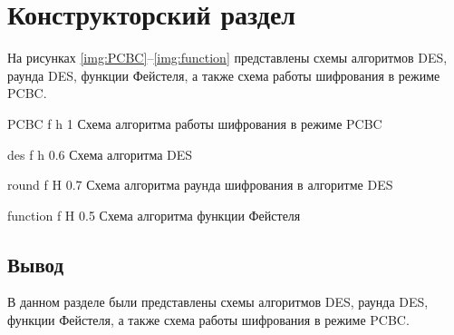 \chapter{Конструкторский раздел}

На рисунках \ref{img:PCBC}--\ref{img:function} представлены схемы алгоритмов DES, раунда DES, функции Фейстеля, а также схема работы шифрования в режиме PCBC.

{PCBC} %
{f} %
{h} %
{1\textwidth} %
{Схема алгоритма работы шифрования в режиме PCBC} %

{des} %
{f} %
{h} %
{0.6\textwidth} %
{Схема алгоритма DES} %

{round} %
{f} %
{H} %
{0.7\textwidth} %
{Схема алгоритма раунда шифрования в алгоритме DES} %

{function} %
{f} %
{H} %
{0.5\textwidth} %
{Схема алгоритма функции Фейстеля} %

\section*{Вывод}

В данном разделе были представлены схемы алгоритмов DES, раунда DES, функции Фейстеля, а также схема работы шифрования в режиме PCBC.




